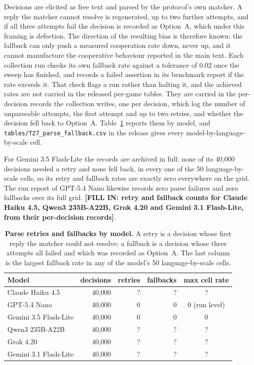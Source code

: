 \documentclass[openacc]{rsproca_new}
\newif\ifhighlightrevisions
\newcommand{\rev}[1]{{\color{red}#1}}
\newcommand{\rev}[1]{#1}
\newcommand{\revisioncolor}{\ifhighlightrevisions\color{red}\fi}
\newcommand{\fillin}[1]{\textbf{[FILL IN: #1]}}
\begin{document}
Decisions are elicited as free text and parsed by the protocol's own matcher. A
reply the matcher cannot resolve is regenerated, up to two further attempts,
and if all three attempts fail the decision is recorded as Option~A, which
under this framing is defection. The direction of the resulting bias is
therefore known: the fallback can only push a measured cooperation rate down,
never up, and it cannot manufacture the cooperative behaviour reported in the
main text. Each collection run checks its own fallback rate against a tolerance
of 0.02 once the sweep has finished, and records a failed assertion in its
benchmark report if the rate exceeds it. That check flags a run rather than
halting it\rev{, and the achieved rates are not carried in the released per-game
tables. They are carried in the per-decision records the collection writes,
one per decision, which log the number of unparseable attempts, the first
attempt and up to two retries, and whether the decision fell back to
Option~A. Table~\ref{tab:A-fallback} reports them by model, and
\texttt{tables/T27\_parse\_fallback.csv} in the release gives every
model-by-language-by-scale cell.}

\rev{For Gemini 3.5 Flash-Lite the records are archived in full: none of its
40{,}000 decisions needed a retry and none fell back, in every one of the 50
language-by-scale cells, so its retry and fallback rates are exactly zero
everywhere on the grid. The run report of GPT-5.4 Nano likewise records zero
parse failures and zero fallbacks over its full grid.
\fillin{retry and fallback counts for Claude Haiku 4.5, Qwen3 235B-A22B, Grok
4.20 and Gemini 3.1 Flash-Lite, from their per-decision records}.}

\begin{table}[htbp]
\revisioncolor
\centering
\footnotesize
\caption{\textbf{Parse retries and fallbacks by model.} A retry is a
decision whose first reply the matcher could not resolve; a fallback is a
decision whose three attempts all failed and which was recorded as Option~A.
The last column is the largest fallback rate in any of the model's 50
language-by-scale cells.}
\label{tab:A-fallback}
\begin{tabular}{@{}lrrrc@{}}
\toprule
Model & decisions & retries & fallbacks & max cell rate \\
\midrule
Claude Haiku 4.5      & 40{,}000 & ? & ? & ? \\
GPT-5.4 Nano          & 40{,}000 & 0 & 0 & 0 (run level) \\
Gemini 3.5 Flash-Lite & 40{,}000 & 0 & 0 & 0 \\
Qwen3 235B-A22B       & 40{,}000 & ? & ? & ? \\
Grok 4.20             & 40{,}000 & ? & ? & ? \\
Gemini 3.1 Flash-Lite & 40{,}000 & ? & ? & ? \\
\bottomrule
\end{tabular}
\end{table}
\end{document}
